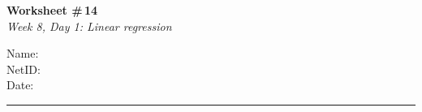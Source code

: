 \documentclass[11pt]{article}
\begin{document}
\noindent
\begin{minipage}[t]{0.55\textwidth}
  \vspace{0pt}
  {\LARGE \textbf{Worksheet \#\,14}} \\[0.3em]
  {\large \textit{Week 8, Day 1: Linear regression}}
\end{minipage}
\hfill
\begin{minipage}[t]{0.40\textwidth}
  \vspace{0pt}
  \begin{mdframed}[linecolor=black, linewidth=1pt, innertopmargin=10pt, innerbottommargin=10pt]
    \small
    \vspace{0.4cm}
    Name: \underline{\hspace{4.5cm}} \\[1em]
    NetID: \underline{\hspace{4.3cm}} \\[1em]
    Date: \underline{\hspace{4.4cm}} \\
  \end{mdframed}
\end{minipage}

\vspace{1em}
\noindent\rule{\linewidth}{1pt}
\vspace{0.2em}
\end{document}
